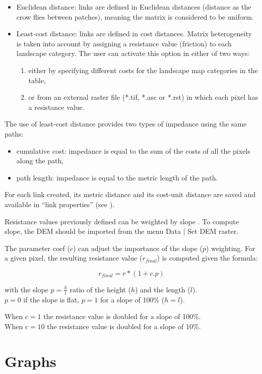 \documentclass{article}
\begin{document}
\begin{itemize}
	\item Euclidean distance: links are defined in Euclidean distances (distance as the crow flies between patches), meaning the matrix is considered to be uniform.
	\item Least-cost distance: links are defined in cost distances. Matrix heterogeneity is taken into account by assigning a resistance value (friction) to each landscape category. The user can activate this option in either of two ways:
	\begin{enumerate}
		\item either by specifying different costs for the landscape map categories in the table,
		\item or from an external raster file (*.tif, *.asc or *.rst) in which each pixel has a resistance value.
	\end{enumerate}
\end{itemize}


The use of least-cost distance provides two types of impedance using the same paths:
\begin{itemize}
	\item cumulative cost: impedance is equal to the sum of the costs of all the pixels along the path,
	\item path length: impedance is equal to the metric length of the path.
\end{itemize}
For each link created, its metric distance and its cost-unit distance are saved and available in “link properties” (see ). 

Resistance values previously defined can be weighted by slope \cite{2015_monkey}. To compute slope, the DEM should be imported from the menu Data | Set DEM raster. 

The parameter coef ($c$) can adjust the importance of the slope ($p$) weighting. For a given pixel, the resulting resistance value ($r_{final}$) is computed given the formula:  

$$r_{final} = r * (1 + c.p)$$

with the slope $p=\frac{h}{l}$ ratio of the height ($h$) and the length ($l$).\\ 
$p=0$ if the slope is flat, $p=1$ for a slope of 100\% ($h=l$).

When $c=1$ the resistance value is doubled for a slope of 100\%.\\
When $c=10$ the resistance value is doubled for a slope of 10\%.

\section{Graphs}
\end{document}
